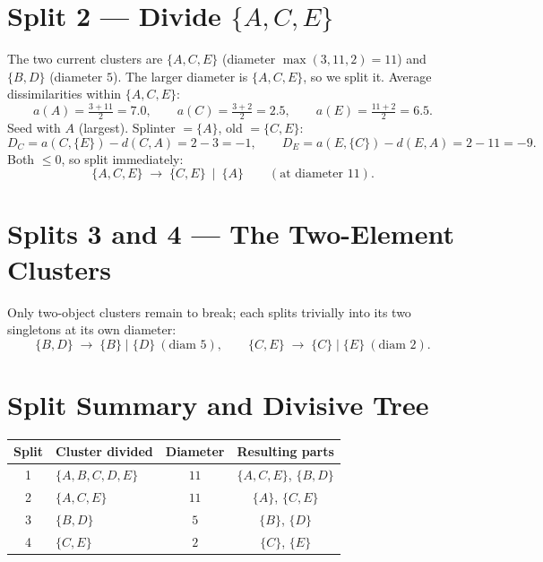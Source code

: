\documentclass[11pt,a4paper]{report}
\theoremstyle{definition}
\theoremstyle{plain}
\theoremstyle{remark}
\begin{document}
\section{Split 2 --- Divide $\{A,C,E\}$}
The two current clusters are $\{A,C,E\}$ (diameter $\max(3,11,2)=11$) and
$\{B,D\}$ (diameter $5$). The larger diameter is $\{A,C,E\}$, so we split it.
Average dissimilarities within $\{A,C,E\}$:
\[
a(A)=\tfrac{3+11}{2}=7.0,\qquad a(C)=\tfrac{3+2}{2}=2.5,\qquad
a(E)=\tfrac{11+2}{2}=6.5 .
\]
Seed with $A$ (largest). Splinter $=\{A\}$, old $=\{C,E\}$:
\[
D_C=a(C,\{E\})-d(C,A)=2-3=-1,\qquad
D_E=a(E,\{C\})-d(E,A)=2-11=-9 .
\]
Both $\le0$, so split immediately:
\[
\{A,C,E\}\;\longrightarrow\;\{C,E\}\ \mid\ \{A\}\qquad(\text{at diameter }11).
\]

\section{Splits 3 and 4 --- The Two-Element Clusters}
Only two-object clusters remain to break; each splits trivially into its two
singletons at its own diameter:
\[
\{B,D\}\;\longrightarrow\;\{B\}\mid\{D\}\ (\text{diam }5),\qquad
\{C,E\}\;\longrightarrow\;\{C\}\mid\{E\}\ (\text{diam }2).
\]

\section{Split Summary and Divisive Tree}
\begin{center}
\begin{tabular}{@{}clcc@{}}
\toprule
Split & Cluster divided & Diameter & Resulting parts\\
\midrule
1 & $\{A,B,C,D,E\}$ & $11$ & $\{A,C,E\}$, $\{B,D\}$\\
2 & $\{A,C,E\}$     & $11$ & $\{A\}$, $\{C,E\}$\\
3 & $\{B,D\}$       & $5$  & $\{B\}$, $\{D\}$\\
4 & $\{C,E\}$       & $2$  & $\{C\}$, $\{E\}$\\
\bottomrule
\end{tabular}
\end{center}
\end{document}
